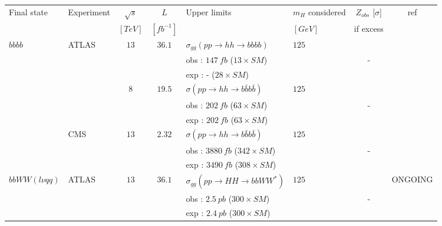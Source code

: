 \begin{table}[h!]
\tiny
\begin{center}
\begin{tabular}{|l|l|c|c|l|l|c|c|}
\hline
Final state                &Experiment        &$\sqrt{s}$    &$L$        &Upper limits    &$m_H$ considered &$Z_{obs}$ [$\sigma$]    &ref\\
\multicolumn{1}{|c|}{}            &            &$[TeV]$    &$[fb^{-1}]$    &        &$[GeV]$          &if excess    &\\
\hline
$bb bb$                    &ATLAS            &$13$        &$36.1$        &$\sigma_{gg}(pp\rightarrow hh\rightarrow bbbb)$  &$125$                &    &\cite{Aaboud:2018knk}\\
                    &            &        &        &obs : $147\ fb$ ($13\times SM$) &                    &-    &\\
                    &            &        &        &exp : - ($28\times SM$) &                    &    &\\
\cline{3-8}
                    &            &$8$        &$19.5$        &$\sigma(pp\rightarrow hh\rightarrow b\bar{b}b\bar{b})$  &$125$    &    &\cite{Aad:2015uka}\\
                    &            &        &        &obs : $202\ fb$ ($63\times SM$)            &    &-    &\\
                    &            &        &        &exp : $202\ fb$ ($63\times SM$)            &    &    &\cite{Aad:2015xja}\\
\cline{2-8}
                    &CMS            &$13$        &$2.32$        &$\sigma(pp\rightarrow hh\rightarrow b\bar{b}b\bar{b})$  &$125$     &    &\cite{CMS:2016foy}\\
                    &            &        &        &obs : $3880\ fb$  ($342\times SM$)                &    &-    &\\
                    &            &        &        &exp : $3490\ fb$  ($308\times SM$)                &    &    &\\

\hline
$bb WW (l\nu qq)$            &ATLAS            &$13$        &$36.1$        &$\sigma_{gg}(pp\rightarrow HH\rightarrow bbWW^*)$    &$125$     &    &ONGOING\\
                    &            &        &        &obs : $2.5\ pb$ ($300\times SM$)            &    &-    &\\
                    &            &        &        &exp : $2.4\ pb$ ($300\times SM$)                &    &    &\\




\end{tabular}
\end{center}
\end{table}
